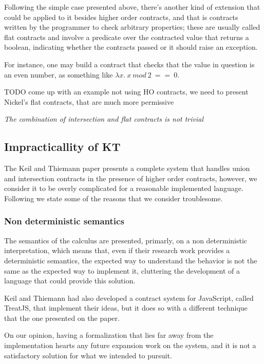 Following the simple case presented above, there's another kind of extension that could be
applied to it besides higher order contracts, and that is contracts written by the
programmer to check arbitrary properties; these are usually called flat contracts and
involve a predicate over the contracted value that returns a boolean, indicating whether
the contracts passed or it should raise an exception.

For instance, one may build a contract that checks that the value in question is an
even number, as something like $\lambda x.~x~mod~2~==~0$.

TODO come up with an example not using HO contracts, we need to present Nickel's flat contracts,
that are much more permissive

\textit{The combination of intersection and flat contracts is not trivial}


\subsection{Impracticallity of KT}

The Keil and Thiemann paper presents a complete system that handles union and intersection
contracts in the presence of higher order contracts, however, we consider it to be overly
complicated for a reasonable implemented language.
Following we state some of the reasons that we consider troublesome.

\subsubsection{Non deterministic semantics}

The semantics of the calculus are presented, primarly, on a non deterministic interpretation,
which means that, even if their research work provides a deterministic semantics,
the expected way to understand
the behavior is not the same as the expected way to implement it, cluttering the development
of a language that could provide this solution.

Keil and Thiemann had also developed a contract system for JavaScript, called TreatJS, that
implement their ideas, but it does so with a different technique that the one presented
on the paper.

On our opinion, having a formalization that lies far away from the implementation
hearts any future expansion work on the system, and it is not a satisfactory solution
for what we intended to pursuit.



